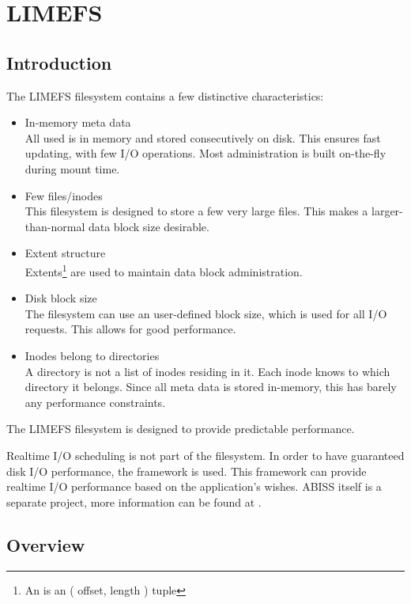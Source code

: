 \chapter{LIMEFS}

\section{Introduction}

The LIMEFS filesystem contains a few distinctive characteristics:

\begin{itemize}
\item In-memory meta data \\
All  used is in memory and stored consecutively on disk. This ensures fast updating, with few I/O operations. Most administration is built on-the-fly during mount time.
\item Few files/inodes \\
This filesystem is designed to store a few very large files. This makes a larger-than-normal data block size desirable.
\item Extent structure \\
Extents\footnote{An  is an ( offset, length ) tuple} are used to maintain data block administration.
\item Disk block size \\
The filesystem can use an user-defined block size, which is used for all I/O requests. This allows for good performance.
\item Inodes belong to directories \\
A directory is not a list of inodes residing in it. Each inode knows to which directory it belongs. Since all meta data is stored in-memory, this has barely any performance constraints.
\end{itemize}

The LIMEFS filesystem is designed to provide predictable performance.

Realtime I/O scheduling is not part of the filesystem. In order to have guaranteed disk I/O performance, the  framework is used. This framework can provide realtime I/O performance based on the application's wishes. ABISS itself is a separate project, more information can be found at \cite{ABISS}.

\section{Overview}

